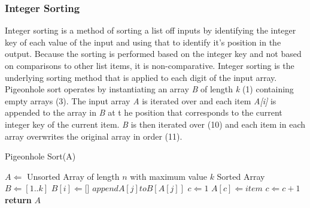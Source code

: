 \documentclass[12pt]{article}
\begin{document}
	\subsubsection{Integer Sorting}
	Integer sorting is a method of sorting a list off inputs by identifying the integer key of each value of the input and using that to identify it's position in the output. Because the sorting is performed based on the integer key and not based on comparisons to other list items, it is non-comparative. Integer sorting is the underlying sorting method that is applied to each digit of the input array.
	\label{ssec:pigeonhole}
	Pigeonhole sort operates by instantiating an array \textit{B} of length \textit{k} (1) containing empty arrays (3). The input array \textit{A} is iterated over and each item \textit{A[i]} is appended to the array in \textit{B} at t he position that corresponds to the current integer key of the current item. \textit{B} is then iterated over (10) and each item in each array overwrites the original array in order (11). 
	\begin{algorithm}[H] %
		\caption{Pigeonhole Sort({A})} %
		\label{alg1} %
		\begin{algorithmic}[1] %
			\REQUIRE $A \Leftarrow$ Unsorted Array of length $n$ with maximum value $k$
			\ENSURE Sorted Array
			\STATE $B \Leftarrow [1..k]$ 
			\STATE $B[i] \Leftarrow [$\space$]$ 
			\ENDFOR
			\STATE $append$\space$ A[j]$\space$ to$\space$ B[A[j]]$ 
			\ENDFOR
			\STATE $c \Leftarrow 1$ 
			\STATE $A[c] \Leftarrow item$ 
			\STATE $c \Leftarrow c + 1$		
			\ENDFOR
			\ENDFOR
			\STATE \textbf{return} $A$
		\end{algorithmic}
	\end{algorithm}
\end{document}
